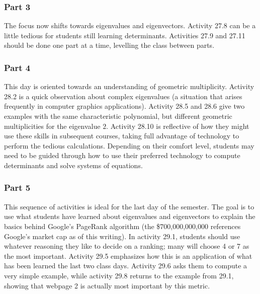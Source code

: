 \documentclass{article}
\begin{document}
\subsubsection*{Part 3}
The focus now shifts towards eigenvalues and eigenvectors.  Activity 27.8 can be a little tedious for students still learning determinants.  Activities 27.9 and 27.11 should be done one part at a time, levelling the class between parts.

\subsubsection*{Part 4}
This day is oriented towards an understanding of geometric multiplicity.  Activity 28.2 is a quick observation about complex eigenvalues (a situation that arises frequently in computer graphics applications).   Activity 28.5 and 28.6 give two examples with the same characteristic polynomial, but different geometric multiplicities for the eigenvalue \(2\).  Activity 28.10 is reflective of how they might use these skills in subsequent courses, taking full advantage of technology to perform the tedious calculations.  Depending on their comfort level, students may need to be guided through how to use their preferred technology to compute determinants and solve systems of equations.

\subsubsection*{Part 5}
This sequence of activities is ideal for the last day of the semester.  The goal is to use what students have learned about eigenvalues and eigenvectors to explain the basics behind Google's PageRank algorithm (the \$700,000,000,000 references Google's market cap as of this writing).  In activity 29.1, students should use whatever reasoning they like to decide on a ranking; many will choose 4 or 7 as the most important.  Activity 29.5 emphasizes how this is an application of what has been learned the last two class days.  Activity 29.6 asks them to compute a very simple example, while activity 29.8 returns to the example from 29.1, showing that webpage 2 is actually most important by this metric.
\end{document}
